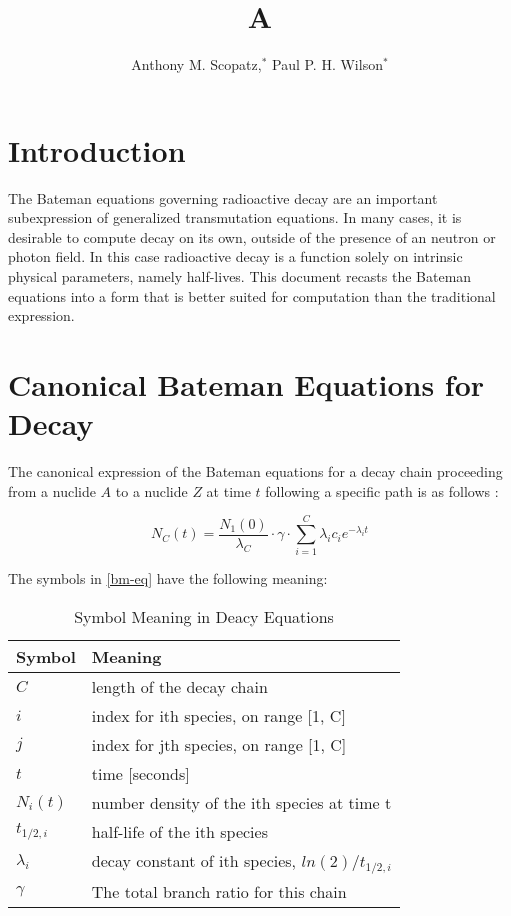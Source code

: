 \documentclass{anstrans}
\title{A}
\author{Anthony M. Scopatz,$^{*}$ Paul P. H. Wilson$^{*}$}
\institute{
$^{*}$The University of Wisconsin-Madison, 1500 Engineering Drive, Madison,
WI
}
\begin{document}
\section{Introduction}

The Bateman equations governing radioactive decay are an important 
subexpression of generalized transmutation equations. In many cases, it is 
desirable to compute decay on its own, outside of the presence of an neutron 
or photon field.  In this case radioactive decay is a function solely on 
intrinsic physical parameters, namely half-lives. This document recasts the 
Bateman equations into a form that is better suited for computation than the 
traditional expression.

\section{Canonical Bateman Equations for Decay}
The canonical expression of the Bateman equations for a decay chain 
proceeding from a nuclide $A$ to a nuclide $Z$ at time 
$t$ following a specific path is as follows \cite{Cetnar2006640}:

\begin{equation}
\label{bm-eq}
N_C(t) = \frac{N_1(0)}{\lambda_C} \cdot \gamma \cdot \sum_{i=1}^C \lambda_i c_{i} e^{-\lambda_i t}
\end{equation}

The symbols in \ref{bm-eq} have the following meaning:

\begin{table}
\caption{Symbol Meaning in Deacy Equations}
\begin{tabular}{|l|l|}
\hline
\textbf{Symbol} & \textbf{Meaning} \\
\hline
$C$         & length of the decay chain\\
$i$         & index for ith species, on range [1, C]\\
$j$         & index for jth species, on range [1, C]\\
$t$         & time [seconds]\\
$N_i(t)$    & number density of the ith species at time t\\
$t_{1/2,i}$ & half-life of the ith species\\
$\lambda_i$ & decay constant of ith species, $ln(2)/t_{1/2,i}$\\
$\gamma$    & The total branch ratio for this chain\\
\hline
\end{tabular}
\end{table}
\end{document}
